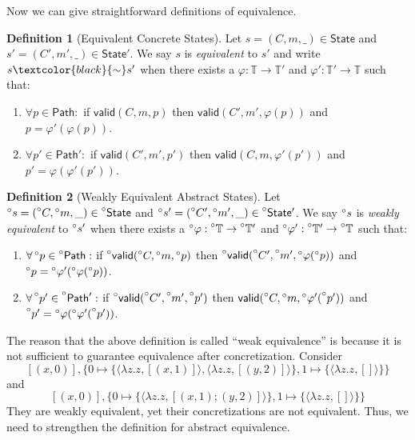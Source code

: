 \documentclass[acmsmall,review]{acmart}\settopmatter{printfolios=true,printccs=false,printacmref=false}
\theoremstyle{definition}
\newtheorem{defn}{Definition}[section]
\theoremstyle{plain}
\newcommand*{\A}[1]{\prescript{\circ}{}{#1}}
\newcommand*{\Time}{\mathbb{T}}
\newcommand*{\ATime}{\A{\Time}}
\newcommand*{\mem}{m}
\newcommand*{\State}{\mathsf{State}}
\newcommand*{\AState}{\A{\mathsf{State}}}
\newcommand*{\valid}{\mathsf{valid}}
\newcommand*{\Path}{\mathsf{Path}}
\newcommand*{\equivalent}[1][black]{\textcolor{#1}{\sim}}
\begin{document}
Now we can give straightforward definitions of equivalence.
\begin{defn}[Equivalent Concrete States]
  Let $s=(C,\mem,\_)\in\State$ and $s'=(C',\mem',\_)\in\State'$.
  We say $s$ is \emph{equivalent} to $s'$ and write $s\equivalent s'$ when there exists a $\varphi:\Time\rightarrow\Time'$ and $\varphi':\Time'\rightarrow\Time$ such that:
  \begin{enumerate}
    \item $\forall p\in\Path:$ if $\valid(C,\mem,p)$ then $\valid(C',\mem',\varphi(p))$ and $p=\varphi'(\varphi(p))$.
    \item $\forall p'\in\Path':$ if $\valid(C',\mem',p')$ then $\valid(C,\mem,\varphi'(p'))$ and $p'=\varphi(\varphi'(p'))$.
  \end{enumerate}
\end{defn}
\begin{defn}[Weakly Equivalent Abstract States]\label{def:weakequiv}
  Let $\A{s}=(\A{C},\A\mem,\_)\in\AState$ and $\A{s}'=(\A{C}',\A\mem',\_)\in\AState'$.
  We say $\A{s}$ is \emph{weakly equivalent} to $\A{s}'$ when there exists a $\A\varphi:\ATime\rightarrow\ATime'$ and $\A\varphi':\ATime'\rightarrow\ATime$ such that:
  \begin{enumerate}
    \item $\forall\A{p}\in\A\Path:$ if $\A\valid(\A{C},\A\mem,\A{p})$ then $\A\valid(\A{C'},\A{\mem'},\A\varphi(\A{p}))$ and $\A{p}=\A\varphi'(\A\varphi(\A{p}))$.
    \item $\forall\A{p'}\in\A{\Path'}:$ if $\A\valid(\A{C'},\A{\mem'},\A{p'})$ then $\valid(\A{C},\A{\mem},\A\varphi'(\A{p'}))$ and $\A{p'}=\A\varphi(\A\varphi'(\A{p'}))$.
  \end{enumerate}
\end{defn}
The reason that the above definition is called ``weak equivalence'' is because it is not sufficient to guarantee equivalence after concretization.
Consider
\[
  [(x,0)],\{0\mapsto\{\langle\lambda z.z,[(x,1)]\rangle,\langle\lambda z.z,[(y,2)]\rangle\},1\mapsto\{\langle\lambda z.z,[]\rangle\}\}
\]
and
\[
  [(x,0)],\{0\mapsto\{\langle\lambda z.z,[(x,1);(y,2)]\rangle\},1\mapsto\{\langle\lambda z.z,[]\rangle\}\}
\]
They are weakly equivalent, yet their concretizations are not equivalent.
Thus, we need to strengthen the definition for abstract equivalence.
\end{document}
